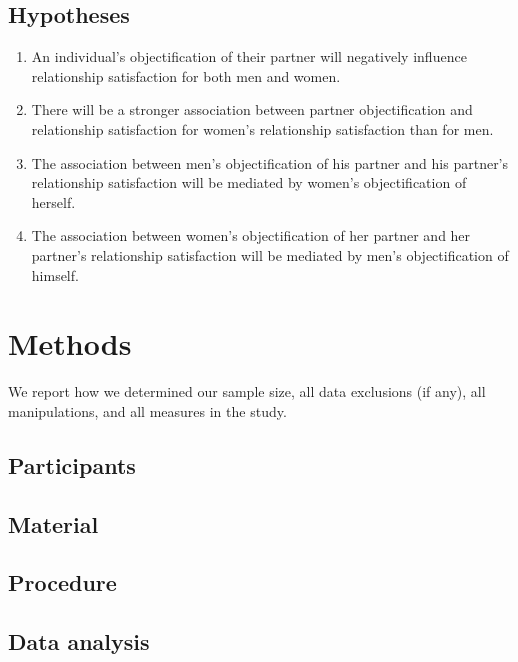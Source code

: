 \documentclass[
  man]{apa6}
\begin{document}
\hypertarget{hypotheses}{%
\subsection{Hypotheses}\label{hypotheses}}

\begin{enumerate}
\def\labelenumi{\arabic{enumi}.}
\item
  An individual's objectification of their partner will negatively influence relationship satisfaction for both men and women.
\item
  There will be a stronger association between partner objectification and relationship satisfaction for women's relationship satisfaction than for men.
\item
  The association between men's objectification of his partner and his partner's relationship satisfaction will be mediated by women's objectification of herself.
\item
  The association between women's objectification of her partner and her partner's relationship satisfaction will be mediated by men's objectification of himself.
\end{enumerate}

\hypertarget{methods}{%
\section{Methods}\label{methods}}

We report how we determined our sample size, all data exclusions (if any), all manipulations, and all measures in the study.

\hypertarget{participants}{%
\subsection{Participants}\label{participants}}

\hypertarget{material}{%
\subsection{Material}\label{material}}

\hypertarget{procedure}{%
\subsection{Procedure}\label{procedure}}

\hypertarget{data-analysis}{%
\subsection{Data analysis}\label{data-analysis}}
\end{document}

